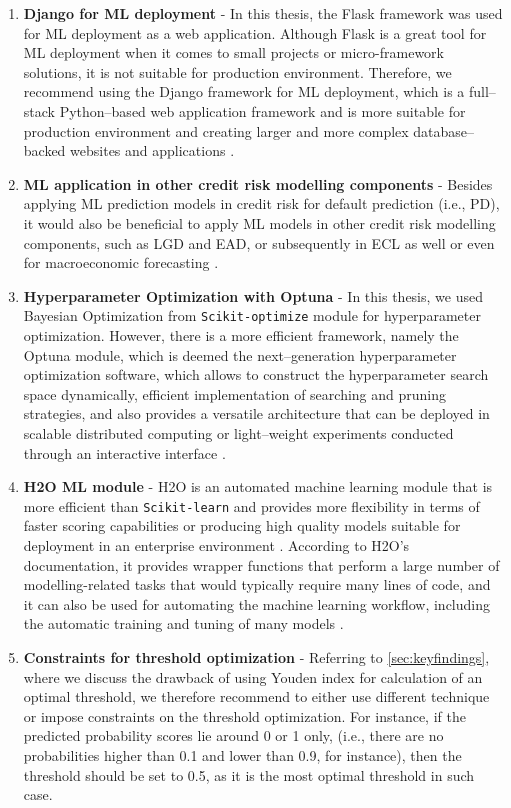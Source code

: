 \begin{enumerate}
    \item \textbf{Django for ML deployment} - In this thesis, the Flask framework was used for ML deployment as a web application. Although Flask is a great tool for ML deployment when it comes to small projects or micro-framework solutions, it is not suitable for production environment.
    Therefore, we recommend using the Django framework for ML deployment, which is a full--stack Python--based web application framework and is more suitable for production environment
    and creating larger and more complex database--backed websites and applications \citep{khatri2023}.
    \item \textbf{ML application in other credit risk modelling components} - Besides applying ML prediction models in credit risk for default prediction (i.e., PD),
    it would also be beneficial to apply ML models in other credit risk modelling components, such as LGD and EAD, or subsequently in ECL as well \citep{munkhdalai2019empirical, grzybowska2020application} or even for macroeconomic forecasting \citep{hall2018machine}.\item \textbf{Hyperparameter Optimization with Optuna} - In this thesis, we used Bayesian Optimization from \lstinline{Scikit-optimize} module for hyperparameter optimization.
    However, there is a more efficient framework, namely the Optuna module, which is deemed the next--generation hyperparameter optimization software,
    which allows to construct the hyperparameter search space dynamically, efficient implementation of searching and pruning strategies, and also provides a versatile architecture that can be deployed in scalable distributed computing or light--weight experiments conducted through an interactive interface \citep{akiba2019optuna}.
    \item \textbf{H2O ML module} - H2O is an automated machine learning module that is more efficient than \lstinline{Scikit-learn} and provides more flexibility in terms of faster scoring capabilities or producing high quality models suitable for deployment in an enterprise environment \citep{ledell2020h2o}.
    According to H2O's documentation, it provides wrapper functions that perform a large number of modelling-related tasks that would typically require many lines of code, and it can also be used for automating the machine learning workflow, including the automatic training and tuning of many models \citep{H2Oai2023}.
    \item \textbf{Constraints for threshold optimization} - Referring to \autoref{sec:keyfindings}, where we discuss the drawback of using Youden index for calculation of an optimal threshold, we therefore recommend to either use different technique or impose constraints on the threshold optimization.
    For instance, if the predicted probability scores lie around 0 or 1 only, (i.e., there are no probabilities higher than 0.1 and lower than 0.9, for instance), then the threshold should be set to 0.5, as it is the most optimal threshold in such case.
\end{enumerate}